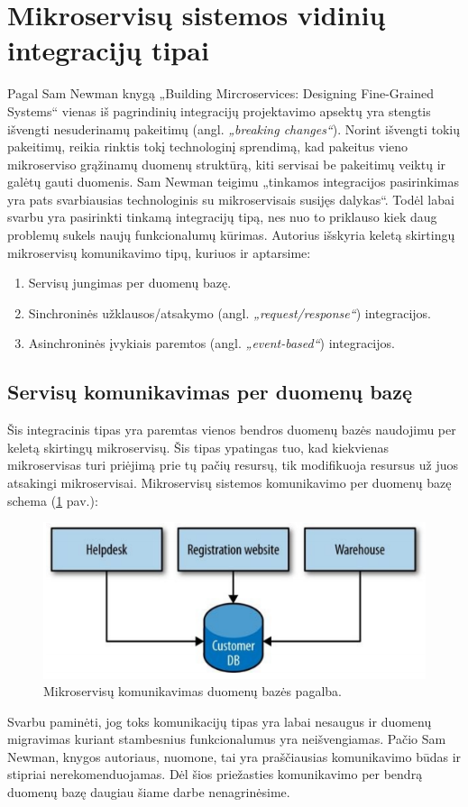 \section{Mikroservisų sistemos vidinių integracijų tipai}
Pagal Sam Newman knygą „Building Mircroservices: Designing Fine-Grained Systems“ \cite{Bk2} vienas iš pagrindinių
integracijų projektavimo apsektų yra stengtis išvengti nesuderinamų pakeitimų (angl. \textit{„breaking changes“}).
Norint išvengti tokių pakeitimų, reikia rinktis tokį technologinį sprendimą, kad pakeitus vieno mikroserviso grąžinamų
duomenų struktūrą, kiti servisai be pakeitimų veiktų ir galėtų gauti duomenis.
Sam Newman teigimu „tinkamos integracijos pasirinkimas yra pats svarbiausias technologinis su mikroservisais susijęs dalykas“.
Todėl labai svarbu yra pasirinkti tinkamą integracijų tipą, nes nuo to priklauso kiek daug problemų sukels naujų funkcionalumų kūrimas.
Autorius išskyria keletą skirtingų mikroservisų komunikavimo tipų, kuriuos ir aptarsime:
\begin{enumerate}
	\item Servisų jungimas per duomenų bazę.
	\item Sinchroninės užklausos/atsakymo (angl. \textit{„request/response“}) integracijos.
	\item Asinchroninės įvykiais paremtos (angl. \textit{„event-based“}) integracijos.
\end{enumerate}

\break

\subsection{Servisų komunikavimas per duomenų bazę}
Šis integracinis tipas yra paremtas vienos bendros duomenų bazės naudojimu per keletą skirtingų mikroservisų.
Šis tipas ypatingas tuo, kad kiekvienas mikroservisas turi priėjimą prie tų pačių resursų, tik modifikuoja resursus
už juos atsakingi mikroservisai. Mikroservisų sistemos komunikavimo per duomenų bazę schema (\ref{img:db-communication} pav.):

\begin{figure}[H]
  \centering
  \includegraphics[scale=0.8]{img/db-communication}
  \caption{Mikroservisų komunikavimas duomenų bazės pagalba.}
  \label{img:db-communication}
\end{figure}

Svarbu paminėti, jog toks komunikacijų tipas yra labai nesaugus ir duomenų migravimas kuriant stambesnius funkcionalumus yra neišvengiamas.
Pačio Sam Newman, knygos \cite{Bk2} autoriaus, nuomone, tai yra praščiausias komunikavimo būdas ir stipriai nerekomenduojamas.
Dėl šios priežasties komunikavimo per bendrą duomenų bazę daugiau šiame darbe nenagrinėsime.